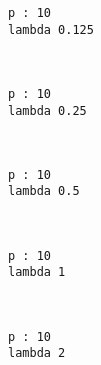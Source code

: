 \documentclass[11pt]{article}
\begin{document}
    \begin{Verbatim}[commandchars=\\\{\}]
p : 10
lambda 0.125

    \end{Verbatim}

    \begin{center}
    \end{center}
    { \hspace*{\fill} \\}
    
    \begin{Verbatim}[commandchars=\\\{\}]
p : 10
lambda 0.25

    \end{Verbatim}

    \begin{center}
    \end{center}
    { \hspace*{\fill} \\}
    
    \begin{Verbatim}[commandchars=\\\{\}]
p : 10
lambda 0.5

    \end{Verbatim}

    \begin{center}
    \end{center}
    { \hspace*{\fill} \\}
    
    \begin{Verbatim}[commandchars=\\\{\}]
p : 10
lambda 1

    \end{Verbatim}

    \begin{center}
    \end{center}
    { \hspace*{\fill} \\}
    
    \begin{Verbatim}[commandchars=\\\{\}]
p : 10
lambda 2

    \end{Verbatim}
\end{document}
